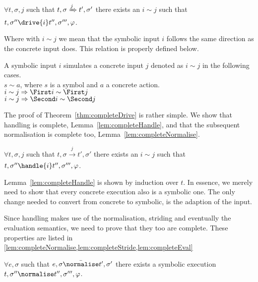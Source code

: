 \begin{theorem}
  \label{thm:completeDrive}
  $\forall t,\sigma,j$ such that $t,\sigma \xRightarrow[]{j} t',\sigma'$
  there exists an $i\sim j$ such that $t,\sigma''\drive{i} t'',\sigma''',\phi$.
\end{theorem}

Where with $i\sim j$ we mean that the symbolic input $i$ follows the same direction as the concrete input does.
This relation is properly defined below.

\begin{definition}
  A symbolic input $i$ simulates a concrete input $j$ denoted as $i\sim j$ in the following cases.\\
  $s\sim a$, where $s$ is a symbol and $a$ a concrete action.\\
  $i\sim j\implies \First i \sim \First j$\\
  $i\sim j\implies \Second i \sim \Second j$
\end{definition}

The proof of Theorem~\ref{thm:completeDrive} is rather simple.
We show that handling is complete, Lemma~\ref{lem:completeHandle},
and that the subsequent normalisation is complete too, Lemma~\ref{lem:completeNormalise}.


\begin{lemma}
  \label{lem:completeHandle}
  $\forall t,\sigma,j$ such that $t,\sigma \xrightarrow[]{j} t',\sigma'$
  there exists an $i\sim j$ such that $t,\sigma''\handle{i} t'',\sigma''',\phi$.
\end{lemma}

Lemma~\ref{lem:completeHandle} is shown by induction over $t$.
In essence, we merely need to show that every concrete execution also is a symbolic one.
The only change needed to convert from concrete to symbolic, is the adaption of the input.

Since handling makes use of the normalisation, striding and eventually the evaluation semantics,
we need to prove that they too are complete.
These properties are listed in \cref{lem:completeNormalise,lem:completeStride,lem:completeEval}

\begin{lemma}
  \label{lem:completeNormalise}
  $\forall e,\sigma$ such that $e,\sigma \bar{\normalise}t',\sigma'$
  there exists a symbolic execution $t,\sigma''\normalise t'',\sigma''',\phi$.
\end{lemma}


